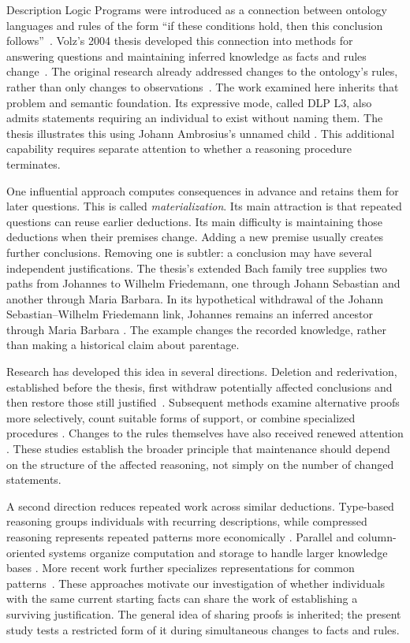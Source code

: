 Description Logic Programs were introduced as a connection between ontology
languages and rules of the form ``if these conditions hold, then this
conclusion follows''~\cite{grosof2003}. Volz's 2004 thesis developed this
connection into methods for answering questions and maintaining inferred
knowledge as facts and rules change~\cite{volz2004}. The original research
already addressed changes to the ontology's rules, rather than only changes
to observations~\cite{volz2003maintenance}. The work examined here inherits
that problem and semantic foundation. Its expressive mode, called DLP L3,
also admits statements requiring an individual to exist without naming them.
The thesis illustrates this using Johann Ambrosius's unnamed child
\cite[Example~4.5.2, p.~94]{volz2004}. This additional capability requires separate
attention to whether a reasoning procedure terminates.

One influential approach computes consequences in advance and retains them
for later questions. This is called \emph{materialization}. Its main attraction
is that repeated questions can reuse earlier deductions. Its main difficulty
is maintaining those deductions when their premises change. Adding a new
premise usually creates further conclusions. Removing one is subtler: a
conclusion may have several independent justifications. The thesis's extended
Bach family tree supplies two paths from Johannes to Wilhelm Friedemann, one
through Johann Sebastian and another through Maria Barbara. In its hypothetical
withdrawal of the Johann Sebastian--Wilhelm Friedemann link, Johannes remains
an inferred ancestor through Maria Barbara
\cite[Section~6.2.1 and Figure~6.2, p.~150]{volz2004}. The example changes the
recorded knowledge, rather than making a historical claim about parentage.

Research has developed this idea in several directions. Deletion and
rederivation, established before the thesis, first withdraw potentially affected
conclusions and then restore those still justified~\cite{gupta1993}.
Subsequent methods examine alternative proofs more selectively, count suitable
forms of support, or combine specialized procedures
\cite{motik2015bf,hu2018,motik2019,hu2022modular}. Changes to the rules
themselves have also received renewed attention
\cite{kotowski2011,xu2023}. These studies establish the broader principle
that maintenance should depend on the structure of the affected reasoning,
not simply on the number of changed statements.

A second direction reduces repeated work across similar deductions.
Type-based reasoning groups individuals with recurring descriptions, while
compressed reasoning represents repeated patterns more economically
\cite{bajraktari2017,hu2019compressed}. Parallel and column-oriented
systems organize computation and storage to handle larger knowledge bases
\cite{motik2014parallel,carral2019}. More recent work further specializes
representations for common patterns~\cite{zhang2024}. These approaches
motivate our investigation of whether individuals with the same current
starting facts can share the work of establishing a surviving justification.
The general idea of sharing proofs is inherited; the present study tests a
restricted form of it during simultaneous changes to facts and rules.

